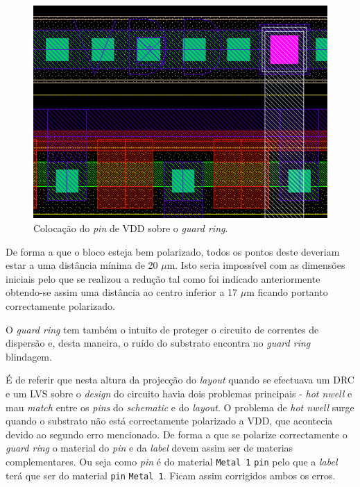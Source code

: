 \documentclass[11pt]{article}
\numberwithin{equation}{section}
\begin{document}
\begin{figure}[H]
	\centering
	\includegraphics[keepaspectratio=true, scale=0.25]{exps/layout/pinVDD}
	\vspace{-0.5em}
	\caption{Colocação do \textit{pin} de VDD sobre o \textit{guard ring}.}
	\vspace{-0.8em}
\end{figure}

De forma a que o bloco esteja bem polarizado, todos os pontos deste deveriam estar a uma distância mínima de 20 $\mu$m. Isto seria impossível com as dimensões iniciais pelo que se realizou a redução tal como foi indicado anteriormente obtendo-se assim uma distância ao centro inferior a 17 $\mu$m ficando portanto correctamente polarizado.

O \textit{guard ring} tem também o intuito de proteger o circuito de correntes de dispersão e, desta maneira, o ruído do substrato encontra no \textit{guard ring} blindagem.

É de referir que nesta altura da projecção do \textit{layout} quando se efectuava um DRC e um LVS sobre o \textit{design} do circuito havia dois problemas principais - \textit{hot nwell} e mau \textit{match} entre os \textit{pins} do \textit{schematic} e do \textit{layout}. O problema de \textit{hot nwell} surge quando o substrato não está correctamente polarizado a VDD, que acontecia devido ao segundo erro mencionado. De forma a que se polarize correctamente o \textit{guard ring} o material do \textit{pin} e da \textit{label} devem assim ser de materias complementares. Ou seja como \textit{pin} é do material \texttt{Metal 1} \texttt{pin} pelo que a \textit{label} terá que ser do material \texttt{pin} \texttt{Metal 1}. Ficam assim corrigidos ambos os erros.
\end{document}
